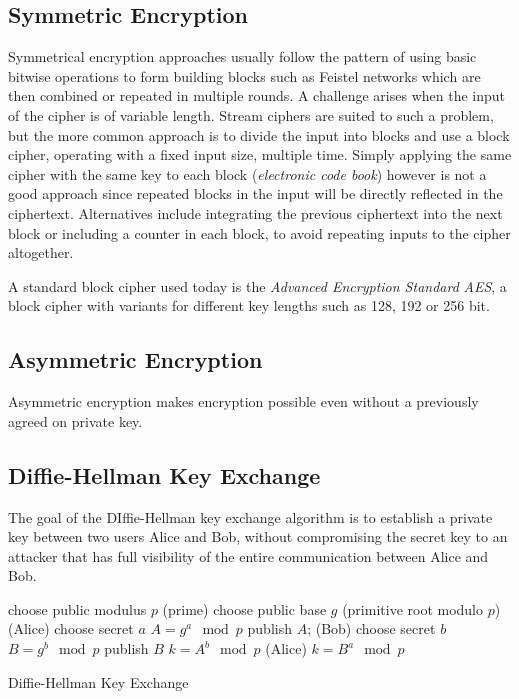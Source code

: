 \subsection{Symmetric Encryption}
Symmetrical encryption approaches usually follow the pattern of using basic
bitwise operations to form building blocks such as Feistel networks which are
then combined or repeated in multiple rounds. A challenge arises when the input
of the cipher is of variable length. Stream ciphers are suited to such a
problem, but the more common approach is to divide the input into blocks and use
a block cipher, operating with a fixed input size, multiple time. Simply
applying the same cipher with the same key to each block (\textit{electronic
code book}) however is not a good approach since repeated blocks in the input
will be directly reflected in the ciphertext. Alternatives include integrating
the previous ciphertext into the next block or including a counter in each
block, to avoid repeating inputs to the cipher altogether.

A standard block cipher used today is the \textit{Advanced Encryption Standard}
\emph{AES}, a block cipher with variants for different key lengths such as 128,
192 or 256 bit.

\subsection{Asymmetric Encryption}

Asymmetric encryption makes encryption possible even without a previously agreed
on private key.

\subsection{Diffie-Hellman Key Exchange}
\label{sec:diffiehellman}
The goal of the DIffie-Hellman key exchange algorithm is to establish a private
key between two users Alice and Bob, without compromising the secret key to an
attacker that has full visibility of the entire communication between Alice and
Bob.

\begin{algorithm}
    \SetAlgoLined
    
    choose public modulus $p$ (prime)\;
    choose public base $g$ (primitive root modulo $p$)\;
    \Begin(Alice){
        choose secret $a$\;
        $A = g^a \mod p$\;
        publish $A$;
    }
    \Begin(Bob){
        choose secret $b$\;
        $B = g^b \mod p$\;
        publish $B$\;
        $k = A^b \mod p$\;
    }
    \Begin(Alice){
        $k = B^a  \mod p$\;
    }
    \caption{Diffie-Hellman Key Exchange}
\end{algorithm}


